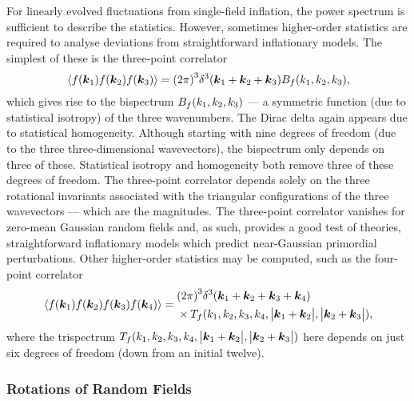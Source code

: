 For linearly evolved fluctuations from single-field inflation, the power spectrum is sufficient to describe the statistics.
However, sometimes higher-order statistics are required to analyse deviations from straightforward inflationary models.
The simplest of these is the three-point correlator
%
\begin{equation}
	\expval*{f(\vb*{k}_{1}) f(\vb*{k}_{2}) f(\vb*{k}_{3})}
	= {(2\pi)}^{3} \delta^{3}(\vb*{k}_{1} + \vb*{k}_{2} + \vb*{k}_{3}) B_{f}(k_{1},k_{2},k_{3}),
\end{equation}
%
which gives rise to the bispectrum \(B_{f}(k_{1},k_{2},k_{3})\) --- a symmetric function (due to statistical isotropy) of the three wavenumbers.
The Dirac delta again appears due to statistical homogeneity.
Although starting with nine degrees of freedom (due to the three three-dimensional wavevectors), the bispectrum only depends on three of these.
Statistical isotropy and homogeneity both remove three of these degrees of freedom.
The three-point correlator depends solely on the three rotational invariants associated with the triangular configurations of the three wavevectors --- which are the magnitudes.
The three-point correlator vanishes for zero-mean Gaussian random fields and, as such, provides a good test of theories, \ie{} straightforward inflationary models which predict near-Gaussian primordial perturbations.
Other higher-order statistics may be computed, such as the four-point correlator
%
\begin{align}
	\expval*{f(\vb*{k}_{1}) f(\vb*{k}_{2}) f(\vb*{k}_{3}) f(\vb*{k}_{4})} =
	\begin{aligned}
		 & {(2\pi)}^{3} \delta^{3}(\vb*{k}_{1} + \vb*{k}_{2} + \vb*{k}_{3} + \vb*{k}_{4}) \\
		 & \times T_{f}(k_{1},k_{2},k_{3},k_{4},\big\lvert\vb*{k}_{1}+\vb*{k}_{2}\big\rvert,\big\lvert\vb*{k}_{2}+\vb*{k}_{3}\big\rvert),
	\end{aligned}
\end{align}
%
where the trispectrum \(T_{f}(k_{1},k_{2},k_{3},k_{4},\big\lvert\vb*{k}_{1}+\vb*{k}_{2}\big\rvert,\big\lvert\vb*{k}_{2}+\vb*{k}_{3}\big\rvert)\) here depends on just six degrees of freedom (down from an initial twelve).

\subsubsection{Rotations of Random Fields}

